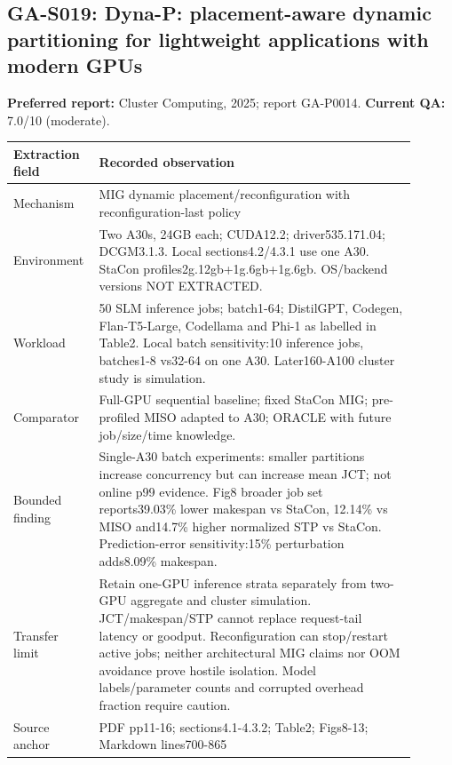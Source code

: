 \subsection{GA-S019: Dyna-P: placement-aware dynamic partitioning for lightweight applications with modern GPUs}
\textbf{Preferred report:} Cluster Computing, 2025; report GA-P0014. \textbf{Current QA:} 7.0/10 (moderate).
\begin{longtable}{P{0.15\linewidth}P{0.75\linewidth}}
\toprule Extraction field & Recorded observation\\\midrule\endhead
Mechanism & MIG dynamic placement/reconfiguration with reconfiguration-last policy\\
Environment & Two A30s, 24GB each; CUDA12.2; driver535.171.04; DCGM3.1.3. Local sections4.2/4.3.1 use one A30. StaCon profiles2g.12gb+1g.6gb+1g.6gb. OS/backend versions NOT EXTRACTED.\\
Workload & 50 SLM inference jobs; batch1-64; DistilGPT, Codegen, Flan-T5-Large, Codellama and Phi-1 as labelled in Table2. Local batch sensitivity:10 inference jobs, batches1-8 vs32-64 on one A30. Later160-A100 cluster study is simulation.\\
Comparator & Full-GPU sequential baseline; fixed StaCon MIG; pre-profiled MISO adapted to A30; ORACLE with future job/size/time knowledge.\\
Bounded finding & Single-A30 batch experiments: smaller partitions increase concurrency but can increase mean JCT; not online p99 evidence. Fig8 broader job set reports39.03\% lower makespan vs StaCon, 12.14\% vs MISO and14.7\% higher normalized STP vs StaCon. Prediction-error sensitivity:15\% perturbation adds8.09\% makespan.\\
Transfer limit & Retain one-GPU inference strata separately from two-GPU aggregate and cluster simulation. JCT/makespan/STP cannot replace request-tail latency or goodput. Reconfiguration can stop/restart active jobs; neither architectural MIG claims nor OOM avoidance prove hostile isolation. Model labels/parameter counts and corrupted overhead fraction require caution.\\
Source anchor & PDF pp11-16; sections4.1-4.3.2; Table2; Figs8-13; Markdown lines700-865\\
\bottomrule\end{longtable}
